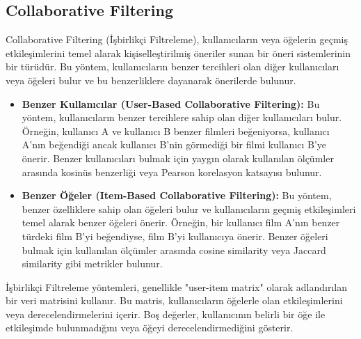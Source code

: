 \newpage

\subsection{Collaborative Filtering}
Collaborative Filtering (İşbirlikçi Filtreleme), kullanıcıların veya öğelerin geçmiş etkileşimlerini temel alarak kişiselleştirilmiş öneriler sunan bir öneri sistemlerinin bir türüdür. Bu yöntem, kullanıcıların benzer tercihleri olan diğer kullanıcıları veya öğeleri bulur ve bu benzerliklere dayanarak önerilerde bulunur.

\begin{itemize}
    \item \textbf{Benzer Kullanıcılar (User-Based Collaborative Filtering):} Bu yöntem, kullanıcıların benzer tercihlere sahip olan diğer kullanıcıları bulur. Örneğin, kullanıcı A ve kullanıcı B benzer filmleri beğeniyorsa, kullanıcı A'nın beğendiği ancak kullanıcı B'nin görmediği bir filmi kullanıcı B'ye önerir. Benzer kullanıcıları bulmak için yaygın olarak kullanılan ölçümler arasında kosinüs benzerliği veya Pearson korelasyon katsayısı bulunur.
    \item \textbf{Benzer Öğeler (Item-Based Collaborative Filtering):} Bu yöntem, benzer özelliklere sahip olan öğeleri bulur ve kullanıcıların geçmiş etkileşimleri temel alarak benzer öğeleri önerir. Örneğin, bir kullanıcı film A'nın benzer türdeki film B'yi beğendiyse, film B'yi kullanıcıya önerir. Benzer öğeleri bulmak için kullanılan ölçümler arasında cosine similarity veya Jaccard similarity gibi metrikler bulunur.
\end{itemize}

İşbirlikçi Filtreleme yöntemleri, genellikle "user-item matrix" olarak adlandırılan bir veri matrisini kullanır. Bu matris, kullanıcıların öğelerle olan etkileşimlerini veya derecelendirmelerini içerir. Boş değerler, kullanıcının belirli bir öğe ile etkileşimde bulunmadığını veya öğeyi derecelendirmediğini gösterir.

\newpage